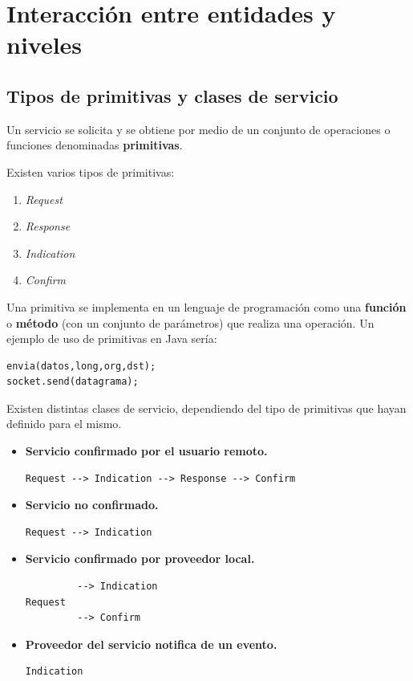 \documentclass[a4paper]{book}
\begin{document}
\newpage
\section{Interacción entre entidades y niveles}
\subsection{Tipos de primitivas y clases de servicio}
Un servicio se solicita y se obtiene por medio de un conjunto de operaciones o funciones denominadas \textbf{primitivas}.

Existen varios tipos de primitivas:
\begin{multicols}{2}
  \begin{enumerate}
    \item \textsl{Request}
    \item \textsl{Response}
    \item \textsl{Indication}
    \item \textsl{Confirm}
  \end{enumerate}

\end{multicols}
Una primitiva se implementa en un lenguaje de programación como una \textbf{función} o \textbf{método} (con un conjunto de parámetros) que realiza una operación. Un ejemplo de uso de primitivas en Java sería:

\begin{lstlisting}
envia(datos,long,org,dst);
socket.send(datagrama);
\end{lstlisting}

Existen distintas clases de servicio, dependiendo del tipo de primitivas que hayan definido para el mismo.
\begin{itemize}
  \item \textbf{Servicio confirmado por el usuario remoto.} \begin{verbatim}
Request --> Indication --> Response --> Confirm
\end{verbatim}
  \item \textbf{Servicio no confirmado.}
        \begin{verbatim}
Request --> Indication
\end{verbatim}
  \item \textbf{Servicio confirmado por proveedor local.}
        \begin{verbatim}
         --> Indication
Request
         --> Confirm
\end{verbatim}
  \item \textbf{Proveedor del servicio notifica de un evento.}
        \begin{verbatim}
Indication
\end{verbatim}
\end{itemize}
\end{document}

